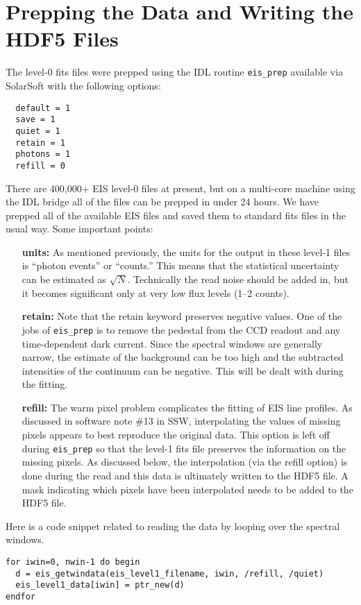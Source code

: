 
\chapter{Prepping the Data and Writing the HDF5 Files}

The level-0 fits files were prepped using the IDL routine \verb+eis_prep+ available via SolarSoft
\citep{Freeland:1998} with the following options:
\begin{verbatim}
  default = 1
  save = 1
  quiet = 1
  retain = 1
  photons = 1
  refill = 0
\end{verbatim}
There are 400,000+ EIS level-0 files at present, but on a multi-core machine using the IDL bridge
all of the files can be prepped in under 24 hours. We have prepped all of the available EIS files
and saved them to standard fits files in the usual way. Some important points:
\begin{enumerate}

\item[\bf units:] As mentioned previously, the units for the output in these level-1 files is
  ``photon events'' or ``counts.''  This means that the statistical uncertainty can be estimated as
  $\sqrt{N}$. Technically the read noise should be added in, but it becomes significant only at
  very low flux levels (1--2 counts).

\item[\bf retain:] Note that the retain keyword preserves negative values. One of the jobs of
  \verb+eis_prep+ is to remove the pedestal from the CCD readout and any time-dependent dark
  current. Since the spectral windows are generally narrow, the estimate of the background can be
  too high and the subtracted intensities of the continuum can be negative. This will be dealt with
  during the fitting.

\item[\bf refill:] The warm pixel problem complicates the fitting of EIS line profiles. As
  discussed in software note \#13 in SSW, interpolating the values of missing pixels appears to
  best reproduce the original data. This option is left off during \verb+eis_prep+ so that the
  level-1 fits file preserves the information on the missing pixels. As discussed below, the
  interpolation (via the refill option) is done during the read and this data is ultimately written
  to the HDF5 file. A mask indicating which pixels have been interpolated needs to be added to the
  HDF5 file.

\end{enumerate}
Here is a code snippet related to reading the data by looping over the spectral windows.
\begin{lstlisting}[language=idl]
for iwin=0, nwin-1 do begin
  d = eis_getwindata(eis_level1_filename, iwin, /refill, /quiet)
  eis_level1_data[iwin] = ptr_new(d)
endfor
\end{lstlisting}
